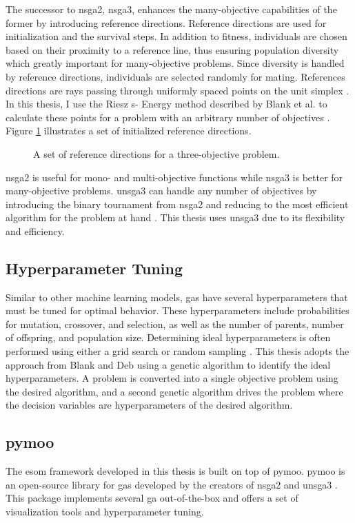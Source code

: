 The successor to \ac{nsga2}, \ac{nsga3}, enhances the many-objective capabilities of 
the former by introducing reference directions. Reference directions are used for 
initialization and the survival steps. In addition to fitness, individuals are chosen 
based on their proximity to a reference line, thus ensuring population diversity which
greatly important for many-objective problems. Since diversity is handled by reference
directions, individuals are selected randomly for mating. References directions are 
rays passing through uniformly spaced points on the unit simplex 
\cite{seada_unified_2016, blank_generating_2021}. In this thesis, I use the Riesz s-
Energy method described by Blank et al. to calculate these points for a problem with an 
arbitrary number of objectives \cite{blank_generating_2021}. Figure \ref{fig:ref-dirs} 
illustrates a set of initialized reference directions.

\begin{figure}[h]
  \centering
  \resizebox{0.6\columnwidth}{!}{}
  \caption{A set of reference directions for a three-objective problem.}
  \label{fig:ref-dirs}
\end{figure}

\ac{nsga2} is useful for mono- and multi-objective functions while \ac{nsga3} is better
for many-objective problems. \ac{unsga3} can handle any number of objectives by 
introducing the binary tournament from \ac{nsga2} and reducing to the most efficient 
algorithm for the problem at hand \cite{seada_unified_2016}. This thesis uses \ac{unsga3} due to its flexibility and efficiency.

\subsection{Hyperparameter Tuning}
Similar to other machine learning models, \acp{ga} have several hyperparameters that
must be tuned for optimal behavior. These hyperparameters include probabilities for mutation, crossover, and selection, as well as the number of parents, number of offspring, and population size. Determining ideal hyperparameters is often 
performed using either a grid search or random sampling \cite{bergstra_random_2012}. 
This thesis adopts the approach from Blank and Deb \cite{blank_pymoo_2020} using
a genetic algorithm to identify the ideal hyperparameters. A problem is converted into a single objective problem using the desired algorithm, and a second genetic algorithm drives the problem where the decision variables are hyperparameters of the desired algorithm.

\subsection{\Acl{pymoo}}

The \ac{esom} framework developed in this thesis is built on top of \ac{pymoo}. 
\ac{pymoo} is an open-source library for \acp{ga} developed by the creators of 
\ac{nsga2} and \ac{unsga3} \cite{blank_pymoo_2020}. This package implements several 
\ac{ga} out-of-the-box and offers a set of visualization tools and hyperparameter 
tuning.




